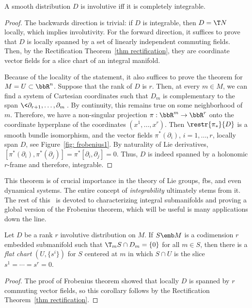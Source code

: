 \begin{thm}\label{thm frobenius}
    A smooth distribution $D$ is involutive iff it is completely integrable.
\end{thm}
\begin{proof}
    The backwards direction is trivial: if $D$ is integrable, then $D=\T N$ locally, which implies involutivity.
    For the forward direction, it suffices to prove that $D$ is locally spanned by a set of linearly independent commuting fields. Then, by the Rectification Theorem~\ref{thm rectification}, they are coordinate vector fields for a slice chart of an integral manifold.

    Because of the locality of the statement, it also suffices to prove the theorem for $M=U\subset \bbR^n$. Suppose that the rank of $D$ is $r$. Then, at every $m\in M$, we can find a system of Cartesian coordinates such that $D_m$ is complementary to the span $\<\partial_{r+1},\ldots,\partial_m\>$. By continuity, this remains true on some neighborhood of $m$. Therefore, we have a non-singular projection $\pi:\bbR^m\to\bbR^r$ onto the coordinate hyperplane of the coordinates $(x^1,\ldots,x^r)$. Then $\restr{\pi_\ast}{D}$ is a smooth bundle isomorphism, and the vector fields $\pi^\ast(\partial_i)$, $i=1,\ldots,r$, locally span $D$, see Figure~\ref{fig: frobenius1}. By naturality of Lie derivatives, $[\pi^\ast(\partial_i),\pi^\ast(\partial_j)]=\pi^\ast[\partial_i,\partial_j]=0.$
    Thus, $D$ is indeed spanned by a holonomic $r$-frame and therefore, integrable.
\end{proof}

This theorem is of crucial importance in the theory of Lie groups, \glspl{fb}, and even dynamical systems. The entire concept of \emph{integrability} ultimately stems from it. The rest of this \sect\ is devoted to characterizing integral submanifolds and proving a global version of the Frobenius theorem, which will be useful is many applications down the line.

\begin{cor}\label{cor 19.13 Lee}
    Let $D$ be a rank $r$ involutive distribution on $M$. If $S\emb M$ is a codimension $r$ embedded submanifold such that $\T_mS\cap D_m=\{0\}$ for all $m\in S$, then there is a \emph{flat chart} $(U,\{s^i\})$ for $S$ centered at $m$ in which $S\cap U$ is the slice $s^1=\cdots=s^r=0$.
\end{cor}
\begin{proof}
    The proof of Frobenius theorem showed that locally $D$ is spanned by $r$ commuting vector fields, so this corollary follows by the Rectification Theorem~\ref{thm rectification}.
\end{proof}

